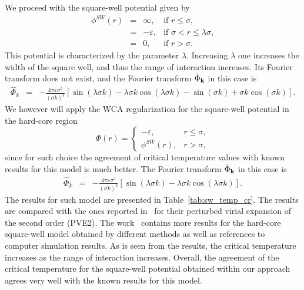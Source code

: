 We proceed with the square-well potential given by
\begin{equation}
	\label{def:sw}
	\begin{array}{llll}
		\phi^{SW}(r) & = & \infty, & \text{if } r\leq \sigma,
		\\
		& = & -\varepsilon, & \text{if } \sigma < r \leq \lambda\sigma,
		\\
		& = & 0, & \text{if } r > \sigma.
	\end{array}
\end{equation}
This potential is characterized by the parameter $\lambda$. Increasing $\lambda$ one increases the width of the square well, and thus the range of interaction increases.
Its Fourier transform does not exist, and the Fourier transform $\hat{\Phi}_{\vb k}$ in this case is
\begin{eqnarray*}
	\hat{\Phi}_k & = & -\frac{4\pi\varepsilon\sigma^3}{(\sigma k)^3} 
	\left[\sin(\lambda \sigma k) - \lambda \sigma k \cos(\lambda \sigma k) - \sin(\sigma k) + \sigma k \cos(\sigma k)\right].
\end{eqnarray*}
We however will apply the WCA regularization for the square-well potential
in the hard-core region
\begin{equation}
	\label{def:sw-wca}
	\Phi(r) = \left\{
	\begin{array}{cc}
		-\varepsilon, & r \leq \sigma, 
		\\
		\phi^{SW}(r), & r > \sigma,
	\end{array}
	\right.
\end{equation}
since for such choice the agreement of critical temperature values with known results for this model is much better. The Fourier transform $\hat{\Phi}_{\vb k}$ in this case is
\begin{eqnarray*}
	\hat{\Phi}_k & = & -\frac{4\pi\varepsilon\sigma^3}{(\sigma k)^3} 
	\left[\sin(\lambda \sigma k) - \lambda \sigma k \cos(\lambda \sigma k)\right].
\end{eqnarray*}
The results for such model are presented in Table~\ref{tab:sw_temp_cr}. The results are compared with the ones reported in~\cite{KreiciNezbeda2012} for their perturbed virial expansion of the second order (PVE2). The work~\cite{KreiciNezbeda2012} contains more results for the hard-core square-well model obtained by different methods as well as references to computer simulation results.  
As is seen from the results, the critical temperature increases as the range of interaction increases. Overall, the agreement of the critical temperature for the square-well potential obtained within our approach agrees very well with the known results for this model.

